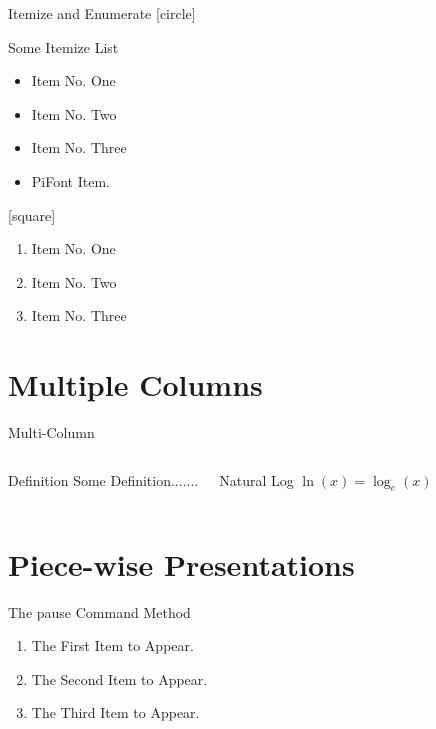 \documentclass[hideallsubsections]{beamer}
\begin{document}
	\begin{frame}{Itemize and Enumerate}
		[circle]
		\begin{block}{Some Itemize List}
			\begin{itemize}
				\item Item No. One 
				\item Item No. Two 
				\item Item No. Three
				\item[\ding{225}] PiFont Item.
			\end{itemize}
		\end{block}	
		[square]
		\begin{enumerate}
			\item Item No. One
			\item Item No. Two
			\item Item No. Three
		\end{enumerate}			
	\end{frame}
	
	\section{Multiple Columns}
	\begin{frame}{Multi-Column}
		\begin{columns}
			\begin{block}{Definition} 
				Some Definition....... 
			\end{block} %
			\begin{exampleblock}{Natural Log} 
				$\ln(x)=\log_e(x)$ 
			\end{exampleblock} 
		\end{columns}
	\end{frame}
	
	\section{Piece-wise Presentations}
	\begin{frame}{The pause Command Method}
		\begin{enumerate}
			\item The First Item to Appear. \pause
			\item The Second Item to Appear. \pause
			\item The Third Item to Appear.	
		\end{enumerate}
	\end{frame}
	
\end{document}
